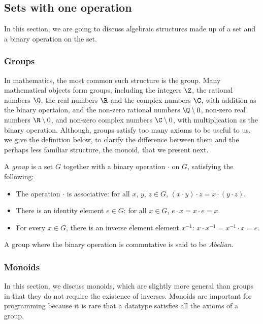 \subsection{Sets with one operation} %
In this section, we are going to discuss algebraic structures made up of a set and a binary operation on the set.
\subsubsection{Groups}
In mathematics, the most common such structure is the group. Many mathematical objects form groups, including the integers $\Z$, the rational numbers $\Q$, the real numbers $\R$ and the complex numbers $\C$, with addition as the binary opertaion, and the non-zero rational numbers $\Q\setminus{0}$, non-zero real numbers $\R\setminus{0}$, and non-zero complex numbers $\C\setminus{0}$, with multiplication as the binary operation. Although, groups satisfy too many axioms to be useful to us, we give the definition below, to clarify the difference between them and the perhaps less familiar structure, the monoid, that we present next.
\begin{Definition}
A \emph{group} is a set $G$ together with a binary operation $\cdot$ on $G$, satisfying the following:
\begin{itemize}
\item The operation $\cdot$ is associative: for all $x$, $y$, $z \in G$, $(x \cdot y) \cdot z = x \cdot (y \cdot z)$. 
\item There is an identity element $e \in G$: for all $x \in G$, $e \cdot x = x \cdot e = x$.
\item For every $x \in G$, there is an inverse element element $x^{-1}$: $x \cdot x^{-1} = x^{-1} \cdot x = e$.
\end{itemize}
A group where the binary operation is commutative is said to be \emph{Abelian}.
\end{Definition}


\subsubsection{Monoids}
In this section, we discuss monoids, which are slightly more general than groups in that they do not require the existence of inverses. Monoids are important for programming because it is rare that a datatype satisfies all the axioms of a group.

